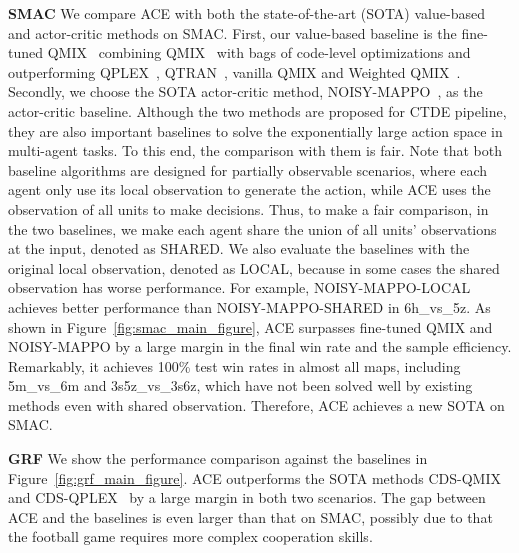 \documentclass[letterpaper]{article} \usepackage{aaai23}  \usepackage{times}  \usepackage{helvet}  \usepackage{courier}  \usepackage[hyphens]{url}  \usepackage{graphicx} \urlstyle{rm} \def\UrlFont{\rm}  \usepackage{natbib}  \usepackage{caption} \frenchspacing  \setlength{\pdfpagewidth}{8.5in} \setlength{\pdfpageheight}{11in} \usepackage{algorithm}
\begin{document}
\textbf{SMAC}
We compare ACE with both the state-of-the-art (SOTA) value-based and actor-critic methods on SMAC. First, our value-based baseline is the fine-tuned QMIX~\citeyear{pymarl2} combining QMIX~\citeyear{qmix} with bags of code-level optimizations and outperforming QPLEX~\citeyear{wang2020qplex}, QTRAN~\citeyear{qtran}, vanilla QMIX and Weighted QMIX~\citeyear{wqmix}. Secondly, we choose the SOTA actor-critic method, NOISY-MAPPO~\citeyear{noisy_mappo}, as the actor-critic baseline. Although the two methods are proposed for CTDE pipeline, they are also important baselines to solve the exponentially large action space in multi-agent tasks. To this end, the comparison with them is fair.
Note that both baseline algorithms are designed for partially observable scenarios, where each agent only use its local observation to generate the action, while ACE uses the observation of all units to make decisions. Thus, to make a fair comparison, in the two baselines, we make each agent share the union of all units' observations at the input, denoted as SHARED. We also evaluate the baselines with the original local observation, denoted as LOCAL, because in some cases the shared observation has worse performance. For example, NOISY-MAPPO-LOCAL achieves better performance than NOISY-MAPPO-SHARED in 6h\_vs\_5z. As shown in Figure~\ref{fig:smac_main_figure}, ACE surpasses fine-tuned QMIX and NOISY-MAPPO by a large margin in the final win rate and the sample efficiency. Remarkably, it achieves 100\% test win rates in almost all maps, including 5m\_vs\_6m and 3s5z\_vs\_3s6z, which have not been solved well by existing methods even with shared observation. Therefore, ACE achieves a new SOTA on SMAC.

\textbf{GRF}
We show the performance comparison against the baselines in Figure~\ref{fig:grf_main_figure}. ACE outperforms the SOTA methods CDS-QMIX~\citeyear{cds} and CDS-QPLEX~\citeyear{cds} by a large margin in both two scenarios. The gap between ACE and the baselines is even larger than that on SMAC, possibly due to that the football game requires more complex cooperation skills.
\vspace{-2ex}
\end{document}
